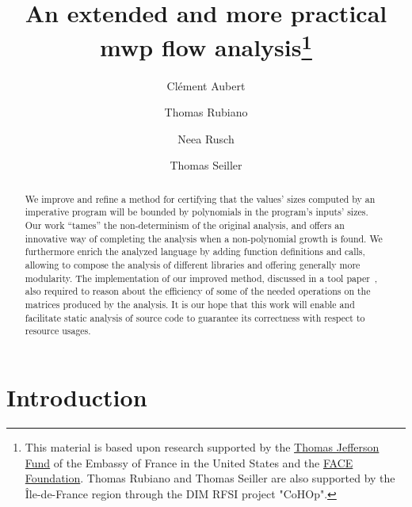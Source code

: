 \documentclass[runningheads]{llncs}
\begin{document}
\title{An extended and more practical mwp flow analysis\thanks{
		This material is based upon research supported by the \href{https://face-foundation.org/higher-education/thomas-jefferson-fund/}{Thomas Jefferson Fund} of the Embassy of France in the United States and the
		\href{https://face-foundation.org/}{FACE Foundation}. Thomas Rubiano and Thomas Seiller are also supported by the Île-de-France region through the DIM RFSI project "CoHOp".} 
}
\author{%
	Clément Aubert \and
	Thomas Rubiano \and
	Neea Rusch \and
	Thomas Seiller
}



\maketitle %

\begin{abstract}
	We improve and refine a method for certifying that the values' sizes computed by an imperative program will be bounded by polynomials in the program's inputs' sizes.
	Our work \enquote{tames} the non-determinism of the original analysis, and offers an innovative way of completing the analysis when a non-polynomial growth is found.
	We furthermore enrich the analyzed language by adding function definitions and calls, allowing to compose the analysis of different libraries and offering generally more modularity.
	The implementation of our improved method, discussed in a tool
	paper~\cite{Aubert2021f}, also required to reason about the efficiency of some of the needed operations on the matrices produced by the analysis.
	It is our hope that this work will enable and facilitate static analysis of source code to guarantee its correctness with respect to resource usages.
\end{abstract}


\section{Introduction}
\label{sec:intro}
\end{document}

